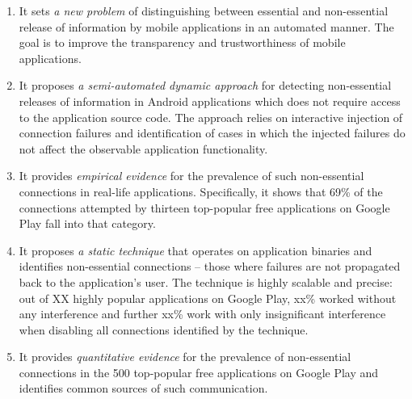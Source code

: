 \vspace{-0.05in}
\begin{enumerate}[leftmargin=0.5cm]\setlength{\itemsep}{-0.01in}

\item It sets \emph{a new problem} of distinguishing between essential and non-essential release of information by mobile applications in an automated manner. The goal is to improve the
transparency and trustworthiness of mobile applications.

\item It proposes \emph{a semi-automated dynamic approach} for detecting non-essential releases of information in Android applications which does not require access to the application source code. 
The approach relies on interactive injection of connection failures and identification of cases in which the injected failures do not affect the observable application functionality. 

\item It provides \emph{empirical evidence} for the prevalence of such non-essential connections in real-life applications. Specifically, it shows that 69\% of the connections attempted by thirteen top-popular free applications on Google Play fall into that category.    

\item It proposes \emph{a static technique} that operates on application binaries and identifies non-essential connections -- those where failures are not propagated back to the application's user. The technique is highly scalable and precise: out of XX highly popular applications on Google Play, 
xx\% worked without any interference and further xx\% work with only insignificant interference when 
disabling all connections identified by the technique.


\item It provides \emph{quantitative evidence} for the prevalence of non-essential connections in the 500 top-popular free applications on Google Play and identifies common sources of such communication. 


\end{enumerate}




